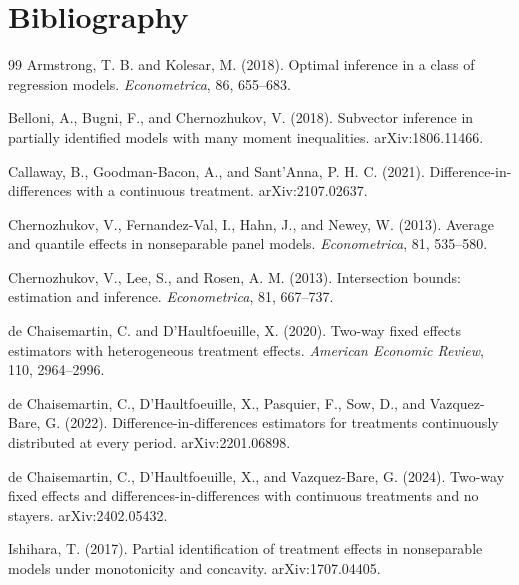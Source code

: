 \documentclass[11pt]{article}
\theoremstyle{definition}
\theoremstyle{plain}
\theoremstyle{remark}
\begin{document}
\section*{Bibliography}
\begin{thebibliography}{99}
Armstrong, T. B. and Kolesar, M. (2018).
Optimal inference in a class of regression models.
\textit{Econometrica}, 86, 655--683.

Belloni, A., Bugni, F., and Chernozhukov, V. (2018).
Subvector inference in partially identified models with many moment
inequalities.
arXiv:1806.11466.

Callaway, B., Goodman-Bacon, A., and Sant'Anna, P. H. C. (2021).
Difference-in-differences with a continuous treatment.
arXiv:2107.02637.

Chernozhukov, V., Fernandez-Val, I., Hahn, J., and Newey, W. (2013).
Average and quantile effects in nonseparable panel models.
\textit{Econometrica}, 81, 535--580.

Chernozhukov, V., Lee, S., and Rosen, A. M. (2013).
Intersection bounds: estimation and inference.
\textit{Econometrica}, 81, 667--737.

de Chaisemartin, C. and D'Haultfoeuille, X. (2020).
Two-way fixed effects estimators with heterogeneous treatment effects.
\textit{American Economic Review}, 110, 2964--2996.

de Chaisemartin, C., D'Haultfoeuille, X., Pasquier, F., Sow, D., and
Vazquez-Bare, G. (2022).
Difference-in-differences estimators for treatments continuously distributed at
every period.
arXiv:2201.06898.

de Chaisemartin, C., D'Haultfoeuille, X., and Vazquez-Bare, G. (2024).
Two-way fixed effects and differences-in-differences with continuous
treatments and no stayers.
arXiv:2402.05432.

Ishihara, T. (2017).
Partial identification of treatment effects in nonseparable models under
monotonicity and concavity.
arXiv:1707.04405.


\end{thebibliography}
\end{document}
